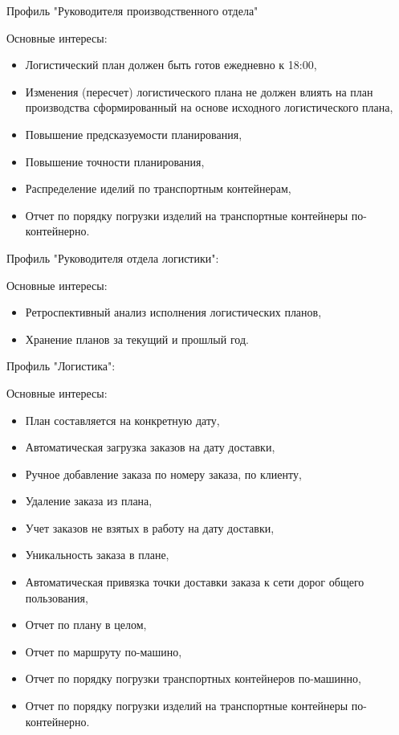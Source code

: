 Профиль "Руководителя производственного отдела"

Основные интересы:
\begin{itemize}
    \item Логистический план должен быть готов ежедневно к 18:00,
    \item Изменения (пересчет) логистического плана не должен влиять на план производства сформированный на основе исходного логистического плана,
    \item Повышение предсказуемости планирования,
    \item Повышение точности планирования,
    \item Распределение иделий по транспортным контейнерам,
    \item Отчет по порядку погрузки изделий на транспортные контейнеры по-контейнерно.
\end{itemize}

Профиль "Руководителя отдела логистики":

Основные интересы:
\begin{itemize}
    \item Ретроспективный анализ исполнения логистических планов,
    \item Хранение планов за текущий и прошлый год.
\end{itemize}

Профиль "Логистика":

Основные интересы:
\begin{itemize}
    \item План составляется на конкретную дату,
    \item Автоматическая загрузка заказов на дату доставки,
    \item Ручное добавление заказа по номеру заказа, по клиенту,
    \item Удаление заказа из плана,
    \item Учет заказов не взятых в работу на дату доставки,
    \item Уникальность заказа в плане,
    \item Автоматическая привязка точки доставки заказа к сети дорог общего пользования,
    \item Отчет по плану в целом,
    \item Отчет по маршруту по-машино,
    \item Отчет по порядку погрузки транспортных контейнеров по-машинно,
    \item Отчет по порядку погрузки изделий на транспортные контейнеры по-контейнерно.
\end{itemize}

